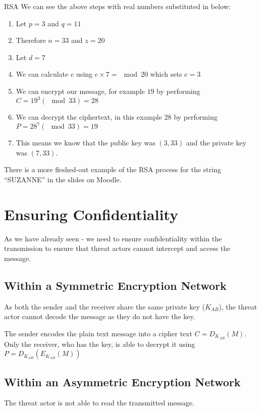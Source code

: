 \begin{example}{RSA}
We can see the above steps with real numbers substituted in below:
\begin{enumerate}
    \item Let $p=3$ and $q=11$
    \item Therefore $n=33$ and $z=20$
    \item Let $d=7$
    \item We can calculate $e$ using  $e \times 7 = \mod 20$ which sets $e=3$
    \item We can encrypt our message, for example $19$ by performing $C = 19^3(\mod 33)=28$
    \item We can decrypt the ciphertext, in this example $28$ by performing $P=28^7(\mod 33)=19$
    \item This means we know that the public key was $(3,33)$ and the private key was $(7,33)$.
\end{enumerate}
\end{example}

\begin{extlink}
There is a more fleshed-out example of the RSA process for the string ``SUZANNE'' in the slides on Moodle.
\end{extlink}

\section{Ensuring Confidentiality}
As we have already seen - we need to ensure confidentiality within the transmission to ensure that threat actors cannot intercept and access the message.

\subsection{Within a Symmetric Encryption Network}
As both the sender and the receiver share the same private key ($K_{AB}$), the threat actor cannot decode the message as they do not have the key. 

The sender encodes the plain text message into a cipher text $C=D_{K_{AB}}(M)$. Only the receiver, who has the key, is able to decrypt it using $P=D_{K_{AB}}(E_{K_{AB}}(M))$

\subsection{Within an Asymmetric Encryption Network}
The threat actor is not able to read the transmitted message. 

